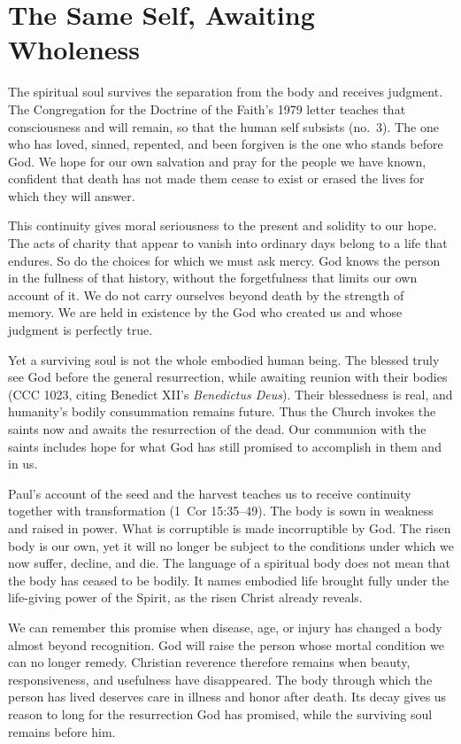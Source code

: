 \section{The Same Self, Awaiting Wholeness}

The spiritual soul survives the separation from the body and receives judgment. The Congregation for the Doctrine of the Faith's 1979 letter teaches that consciousness and will remain, so that the human self subsists (no.~3). The one who has loved, sinned, repented, and been forgiven is the one who stands before God. We hope for our own salvation and pray for the people we have known, confident that death has not made them cease to exist or erased the lives for which they will answer.

This continuity gives moral seriousness to the present and solidity to our hope. The acts of charity that appear to vanish into ordinary days belong to a life that endures. So do the choices for which we must ask mercy. God knows the person in the fullness of that history, without the forgetfulness that limits our own account of it. We do not carry ourselves beyond death by the strength of memory. We are held in existence by the God who created us and whose judgment is perfectly true.

Yet a surviving soul is not the whole embodied human being. The blessed truly see God before the general resurrection, while awaiting reunion with their bodies (CCC 1023, citing Benedict XII's \emph{Benedictus Deus}). Their blessedness is real, and humanity's bodily consummation remains future. Thus the Church invokes the saints now and awaits the resurrection of the dead. Our communion with the saints includes hope for what God has still promised to accomplish in them and in us.

Paul's account of the seed and the harvest teaches us to receive continuity together with transformation (1~Cor 15:35--49). The body is sown in weakness and raised in power. What is corruptible is made incorruptible by God. The risen body is our own, yet it will no longer be subject to the conditions under which we now suffer, decline, and die. The language of a spiritual body does not mean that the body has ceased to be bodily. It names embodied life brought fully under the life-giving power of the Spirit, as the risen Christ already reveals.

We can remember this promise when disease, age, or injury has changed a body almost beyond recognition. God will raise the person whose mortal condition we can no longer remedy. Christian reverence therefore remains when beauty, responsiveness, and usefulness have disappeared. The body through which the person has lived deserves care in illness and honor after death. Its decay gives us reason to long for the resurrection God has promised, while the surviving soul remains before him.

